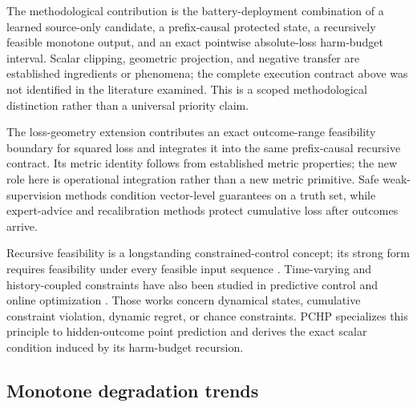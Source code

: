 \documentclass[preprint,12pt]{elsarticle}
\begin{document}
The methodological contribution is the battery-deployment combination of a learned source-only candidate, a prefix-causal protected state, a recursively feasible monotone output, and an exact pointwise absolute-loss harm-budget interval. Scalar clipping, geometric projection, and negative transfer are established ingredients or phenomena; the complete execution contract above was not identified in the literature examined. This is a scoped methodological distinction rather than a universal priority claim.

The loss-geometry extension contributes an exact outcome-range feasibility boundary for squared loss and integrates it into the same prefix-causal recursive contract. Its metric identity follows from established metric properties; the new role here is operational integration rather than a new metric primitive. Safe weak-supervision methods condition vector-level guarantees on a truth set, while expert-advice and recalibration methods protect cumulative loss after outcomes arrive.

Recursive feasibility is a longstanding constrained-control concept; its strong form requires feasibility under every feasible input sequence \citep{lofberg2012oops}. Time-varying and history-coupled constraints have also been studied in predictive control and online optimization \citep{li2021information,garber2024projectionfree,knaup2026recursively}. Those works concern dynamical states, cumulative constraint violation, dynamic regret, or chance constraints. PCHP specializes this principle to hidden-outcome point prediction and derives the exact scalar condition induced by its harm-budget recursion.

\subsection{Monotone degradation trends}
\end{document}

